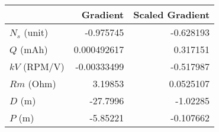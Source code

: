 \begin{tabular}{lrr}
\hline
              &      Gradient &   Scaled Gradient \\
\hline
 $N_s$ (unit) &  -0.975745    &        -0.628193  \\
 $Q$ (mAh)    &   0.000492617 &         0.317151  \\
 $kV$ (RPM/V) &  -0.00333499  &        -0.517987  \\
 $Rm$ (Ohm)   &   3.19853     &         0.0525107 \\
 $D$ (m)      & -27.7996      &        -1.02285   \\
 $P$ (m)      &  -5.85221     &        -0.107662  \\
\hline
\end{tabular}